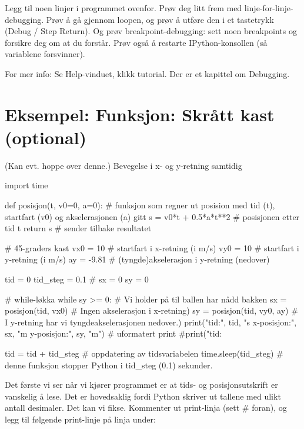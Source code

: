 {\begin{question}
Legg til noen linjer i programmet ovenfor. Prøv deg litt frem med linje-for-linje-debugging. Prøv å gå gjennom loopen, og prøv å utføre den i et tastetrykk (Debug / Step Return). Og prøv breakpoint-debugging: sett noen breakpoints og forsikre deg om at du forstår. Prøv også å restarte IPython-konsollen (så variablene forsvinner). 
\end{question}

For mer info: Se Help-vinduet, klikk tutorial. Der er et kapittel om Debugging.

\section {Eksempel: Funksjon: Skrått kast (optional)}

(Kan evt. hoppe over denne.)
Bevegelse i x- og y-retning samtidig

\begin{usncodebox}
import time

def posisjon(t, v0=0, a=0):    # funksjon som regner ut posision med tid (t), startfart (v0) og akselerasjonen (a) gitt
    s = v0*t + 0.5*a*t**2      # posisjonen etter tid t
    return s                   # sender tilbake resultatet
    

# 45-graders kast
vx0 = 10         # startfart i x-retning (i m/s)
vy0 = 10         # startfart i y-retning (i m/s)
ay = -9.81       # (tyngde)akselerasjon i y-retning (nedover)

tid = 0
tid_steg = 0.1   # 
sx = 0
sy = 0

# while-løkka
while sy >= 0:                    # Vi holder på til ballen har nådd bakken 
    sx = posisjon(tid, vx0)       # Ingen akselerasjon i x-retning) 
    sy = posisjon(tid, vy0, ay)   # I y-retning har vi tyngdeakselerasjonen nedover.)
    print("tid:", tid, "s   x-posisjon:", sx, "m   y-posisjon:", sy, "m")              # uformatert print
    #print("tid: %

    tid = tid + tid_steg          # oppdatering av tidsvariabelen
    time.sleep(tid_steg)          # denne funksjon stopper Python i tid_steg (0.1) sekunder. 
\end{usncodebox}

Det første vi ser når vi kjører programmet er at tids- og posisjonsutskrift er vanskelig å lese. Det er hovedsaklig fordi Python skriver ut tallene med ulikt antall desimaler. Det kan vi fikse. Kommenter ut print-linja (sett \# foran), og legg til følgende print-linje på linja under:

}
